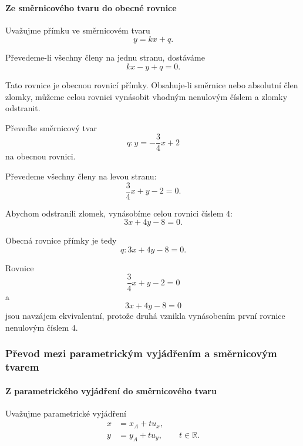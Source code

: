 \paragraph{Ze směrnicového tvaru do obecné rovnice}

Uvažujme přímku ve směrnicovém tvaru
\[
    y=kx+q.
\]

Převedeme-li všechny členy na jednu stranu, dostáváme
\begin{equation}\label{eq:Conversion_slope_to_general}
    kx-y+q=0.
\end{equation}

Tato rovnice je obecnou rovnicí přímky. Obsahuje-li směrnice nebo
absolutní člen zlomky, můžeme celou rovnici vynásobit vhodným
nenulovým číslem a zlomky odstranit.

\begin{example}\label{exa:Conversion_slope_to_general}
    Převeďte směrnicový tvar
    \[
        q:y=-\frac{3}{4}x+2
    \]
    na obecnou rovnici.

    Převedeme všechny členy na levou stranu:
    \[
        \frac{3}{4}x+y-2=0.
    \]

    Abychom odstranili zlomek, vynásobíme celou rovnici číslem $4$:
    \[
        3x+4y-8=0.
    \]

    Obecná rovnice přímky je tedy
    \[
        q:3x+4y-8=0.
    \]

    Rovnice
    \[
        \frac{3}{4}x+y-2=0
    \]
    a
    \[
        3x+4y-8=0
    \]
    jsou navzájem ekvivalentní, protože druhá vznikla vynásobením
    první rovnice nenulovým číslem $4$.
\end{example}


\subsubsection{Převod mezi parametrickým vyjádřením a směrnicovým tvarem}
\label{subsubsec:Conversion_parametric_slope}

\paragraph{Z parametrického vyjádření do směrnicového tvaru}

Uvažujme parametrické vyjádření
\[
    \begin{aligned}
        x&=x_A+t u_x,\\
        y&=y_A+t u_y,
        \qquad t\in\mathbb{R}.
    \end{aligned}
\]


